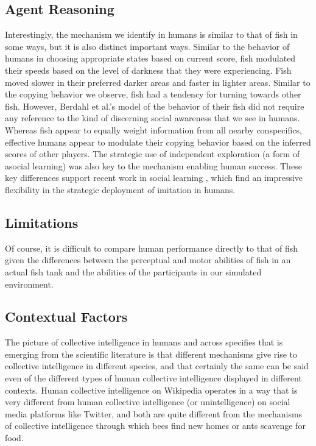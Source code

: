 \documentclass[12pt,letterpaper]{article}
\begin{document}
\subsection{Agent Reasoning}

Interestingly, the mechanism we identify in humans is similar to that
of fish in some ways, but it is also distinct important ways.  Similar
to the behavior of humans in choosing appropriate states based on
current score, fish modulated their speeds based on the level of
darkness that they were experiencing.  Fish moved slower in their
preferred darker areas and faster in lighter areas.  Similar to the
copying behavior we observe, fish had a tendency for turning towards
other fish.  However, Berdahl et al.'s model of the behavior of their
fish did not require any reference to the kind of discerning social
awareness that we see in humans.  Whereas fish appear to equally
weight information from all nearby conspecifics, effective humans
appear to modulate their copying behavior based on the inferred scores
of other players. The strategic use of independent exploration (a form
of asocial learning) was also key to the mechanism enabling human
success. These key differences support recent work in social learning
\cite{wisdom_social_2013, mcelreath_beyond_2008}, which find an
impressive flexibility in the strategic deployment of imitation in
humans. 

\subsection{Limitations}

Of course, it is difficult to compare human performance
directly to that of fish given the differences between the perceptual
and motor abilities of fish in an actual fish tank and the abilities
of the participants in our simulated environment.  



\subsection{Contextual Factors}

The picture of collective intelligence in humans and across specifies that is emerging from the scientific literature is that different mechanisms give rise to collective intelligence in different species, and that certainly the same can be said even of the different types of human collective intelligence displayed in different contexts.  Human collective intelligence on Wikipedia operates in a way that is very different from human collective intelligence (or unintelligence) on social media platforms like Twitter, and both are quite different from the mechanisms of collective intelligence through which bees find new homes or ants scavenge for food. 
\end{document}
